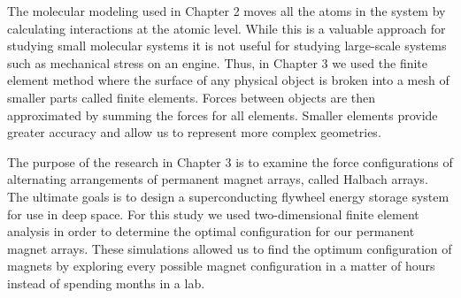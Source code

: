The molecular modeling used in Chapter 2 moves all the atoms in the system by calculating interactions at the atomic level. While this is a valuable approach for studying small molecular systems it is not useful for studying large-scale systems such as mechanical stress on an engine. Thus, in Chapter 3 we used the finite element method where the surface of any physical object is broken into a mesh of smaller parts called finite elements. Forces between objects are then approximated by summing the forces for all elements. Smaller elements provide greater accuracy and allow us to represent more complex geometries.

The purpose of the research in Chapter 3 is to examine the force configurations of alternating arrangements of permanent magnet arrays, called Halbach arrays. The ultimate goals is to design a superconducting flywheel energy storage system for use in deep space. For this study we used two-dimensional finite element analysis in order to determine the optimal configuration for our permanent magnet arrays. These simulations allowed us to find the optimum configuration of magnets by exploring every possible magnet configuration in a matter of hours instead of spending months in a lab. 
